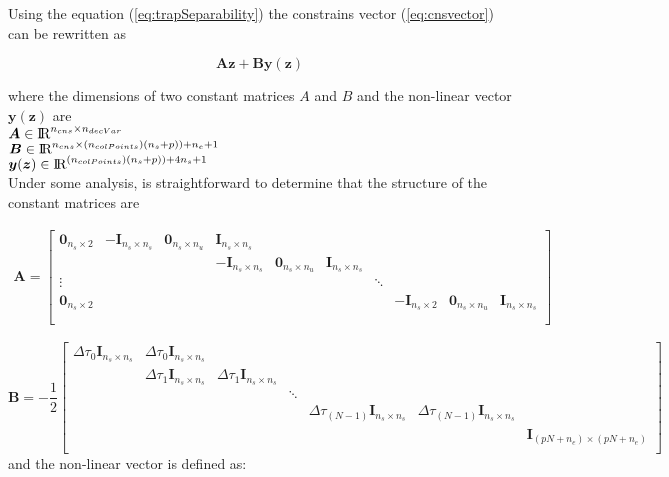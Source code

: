 \documentclass[12pt]{article}
\newcommand{\real}{\mbox{\rm I$\!$R}}
\begin{document}
\noindent Using the equation (\ref{eq:trapSeparability}) the constrains vector (\ref{eq:cnsvector}) can be rewritten as

\begin{equation}
    \bm{A}\bm{z} + \bm{B}\bm{\bm{y}(\bm{z})}
\end{equation}

\noindent where the dimensions of two constant matrices $A$ and $B$ and the non-linear vector $\bm{y}(\bm{z})$ are \\
$\bm{A} \in \real^{n_{cns} \times n_{decVar}}$ \\
$\bm{B} \in \real^{n_{cns} \times (n_{colPoints})(n_s + p))+n_e+1}$ \\
$\bm{y}(\bm{z}) \in \real^{(n_{colPoints})(n_s + p))+4n_s+1}$\\   

\noindent Under some analysis, is straightforward to determine that the structure of the constant matrices are

\begin{eqnarray} \label{eq:matrixA_trap}
\bm{A}= \begin{bmatrix}
\bm{0}_{n_s \times 2}&\bm{-I}_{n_s \times n_s} &\bm{0}_{n_s \times n_u} &\bm{I}_{n_s \times n_s}\\
& & & \bm{-I}_{n_s \times n_s} &\bm{0}_{n_s \times n_u} &\bm{I}_{n_s \times n_s}\\
\vdots& & & & & & \ddots\\
\bm{0}_{n_s\times 2}& & & & & & & \bm{-I}_{n_s \times 2} &\bm{0}_{n_s \times n_u} &\bm{I}_{n_s \times n_s}\\
\\
\end{bmatrix}
\end{eqnarray}

\begin{equation}
\bm{B}=-\frac{1}{2}
\begin{bmatrix}
 \Delta \tau_0\bm{I}_{n_s \times n_s}  & \Delta \tau_0\bm{I}_{n_s \times n_s} &  &  & \\ 
 & \Delta \tau_1\bm{I}_{n_s \times n_s}& \Delta \tau_1\bm{I}_{n_s \times n_s}   & \\ 
 &    & &  \ddots  \\ 
 &    & & & \Delta \tau_{(N-1)}\bm{I}_{n_s \times n_s}&\Delta \tau_{(N-1)}\bm{I}_{n_s \times n_s}\\ 
 &    & & & & &\bm{I}_{(pN+n_e) \times (pN+n_e)}\\
\end{bmatrix}
\end{equation}
%
and the non-linear vector is defined as:
\end{document}
